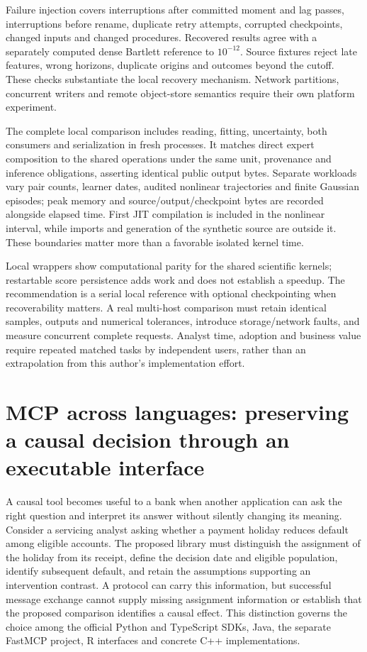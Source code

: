 Failure injection covers interruptions after committed moment and lag passes,
interruptions before rename, duplicate retry attempts, corrupted checkpoints,
changed inputs and changed procedures. Recovered results agree with a separately
computed dense Bartlett reference to $10^{-12}$. Source fixtures reject late
features, wrong horizons, duplicate origins and outcomes beyond the cutoff.
These checks substantiate the local recovery mechanism. Network partitions,
concurrent writers and remote object-store semantics require their own platform
experiment.

The complete local comparison includes reading, fitting, uncertainty, both
consumers and serialization in fresh processes. It matches direct expert
composition to the shared operations under the same unit, provenance and
inference obligations, asserting identical public output bytes. Separate
workloads vary pair counts, learner dates, audited nonlinear trajectories and
finite Gaussian episodes; peak memory and source/output/checkpoint bytes are
recorded alongside elapsed time. First JIT compilation is included in the
nonlinear interval, while imports and generation of the synthetic source are
outside it. These boundaries matter more than a favorable isolated kernel time.

Local wrappers show computational parity for the shared scientific kernels;
restartable score persistence adds work and does not establish a speedup.
The recommendation is a serial local reference with optional checkpointing
when recoverability matters. A real multi-host comparison must retain identical
samples, outputs and numerical tolerances, introduce storage/network faults,
and measure concurrent complete requests. Analyst time, adoption and business
value require repeated matched tasks by independent users, rather than an
extrapolation from this author's implementation effort.


\section{MCP across languages: preserving a causal decision through an executable interface}
\label{sec:exec24-mcp-reuse}

A causal tool becomes useful to a bank when another application can ask the
right question and interpret its answer without silently changing its meaning.
Consider a servicing analyst asking whether a payment holiday reduces default
among eligible accounts. The proposed library must distinguish the assignment
of the holiday from its receipt, define the decision date and eligible
population, identify subsequent default, and retain the assumptions supporting
an intervention contrast. A protocol can carry this information, but successful
message exchange cannot supply missing assignment information or establish that
the proposed comparison identifies a causal effect. This distinction governs
the choice among the official Python and TypeScript SDKs, Java, the separate
FastMCP project, R interfaces and concrete C++ implementations.
\citep{exec24_mcp_contracts}

